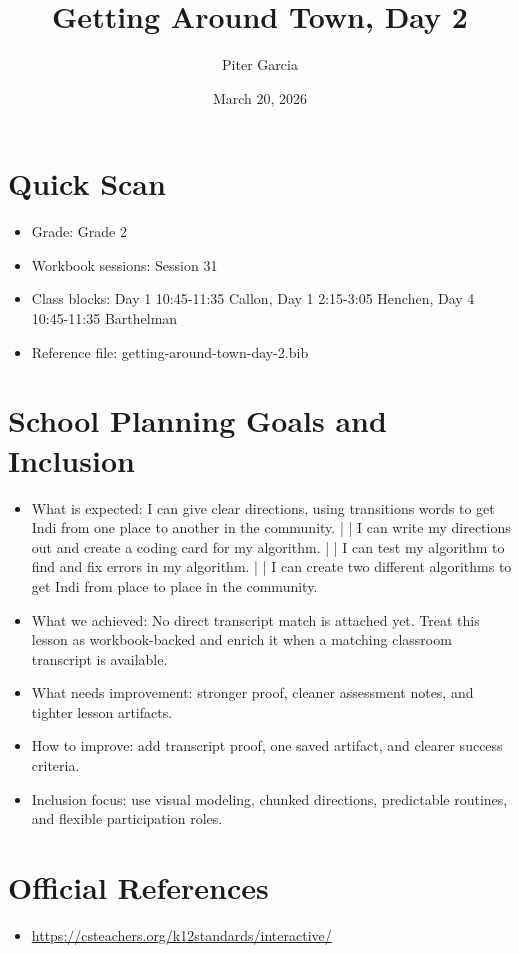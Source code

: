 \documentclass[11pt]{article}
\title{Getting Around Town, Day 2}
\author{Piter Garcia}
\date{March 20, 2026}
\begin{document}
\maketitle
\section*{Quick Scan}
\begin{itemize}[leftmargin=*]
\item Grade: Grade 2
\item Workbook sessions: Session 31
\item Class blocks: Day 1 10:45-11:35 Callon, Day 1 2:15-3:05 Henchen, Day 4 10:45-11:35 Barthelman
\item Reference file: getting-around-town-day-2.bib
\end{itemize}
\section*{School Planning Goals and Inclusion}
\begin{itemize}[leftmargin=*]
\item What is expected: I can give clear directions, using transitions words to get Indi from one place to another in the community. | | I can write my directions out and create a coding card for my algorithm. | | I can test my algorithm to find and fix errors in my algorithm. | | I can create two different algorithms to get Indi from place to place in the community.
\item What we achieved: No direct transcript match is attached yet. Treat this lesson as workbook-backed and enrich it when a matching classroom transcript is available.
\item What needs improvement: stronger proof, cleaner assessment notes, and tighter lesson artifacts.
\item How to improve: add transcript proof, one saved artifact, and clearer success criteria.
\item Inclusion focus: use visual modeling, chunked directions, predictable routines, and flexible participation roles.
\end{itemize}
\section*{Official References}
\begin{itemize}[leftmargin=*]
\item \url{https://csteachers.org/k12standards/interactive/}

\end{itemize}
\end{document}
